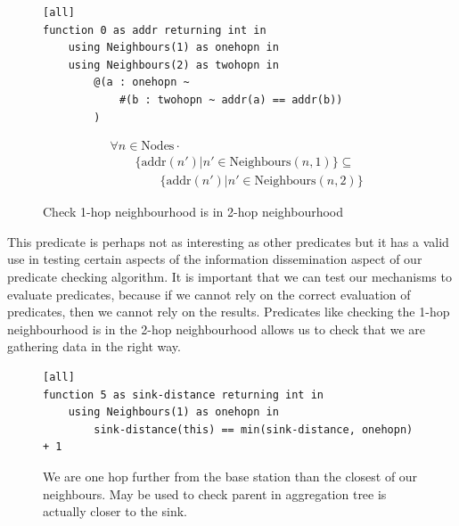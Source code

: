 \begin{figure}[H]
\begin{minipage}{.5\linewidth}
\begin{lstlisting}[language=Hoppy]
[all]
function 0 as addr returning int in
    using Neighbours(1) as onehopn in
    using Neighbours(2) as twohopn in
        @(a : onehopn ~
            #(b : twohopn ~ addr(a) == addr(b))
        )
\end{lstlisting}
\end{minipage}%
\begin{minipage}{.5\linewidth}
\begin{align*}
&				\forall n \in \text{Nodes} \cdot \\
& \hspace{2em}		\{\text{addr}(n') | n' \in \text{Neighbours}(n, 1)\} \subseteq \\
& \hspace{4em}			\{\text{addr}(n') | n' \in \text{Neighbours}(n, 2)\}
\end{align*}
\end{minipage}
\caption{Check 1-hop neighbourhood is in 2-hop neighbourhood}
\end{figure}

This predicate is perhaps not as interesting as other predicates but it has a valid use in testing certain aspects of the information dissemination aspect of our predicate checking algorithm. It is important that we can test our mechanisms to evaluate predicates, because if we cannot rely on the correct evaluation of predicates, then we cannot rely on the results. Predicates like checking the 1-hop neighbourhood is in the 2-hop neighbourhood allows us to check that we are gathering data in the right way.


\begin{figure}[H]
\begin{lstlisting}[language=Hoppy]
[all]
function 5 as sink-distance returning int in
    using Neighbours(1) as onehopn in
        sink-distance(this) == min(sink-distance, onehopn) + 1
\end{lstlisting}
\caption{We are one hop further from the base station than the closest of our neighbours. May be used to check parent in aggregation tree is actually closer to the sink.}
\label{fig:tree-agg-parent-hops-pred-lang}
\end{figure}


